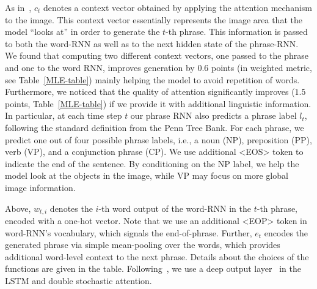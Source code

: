 As in~\cite{Xu15}, $c_t$ denotes a context vector obtained by applying the attention mechanism to the image. This context vector essentially represents the image area that the model ``looks at'' in order to generate the $t$-th phrase. This information is passed to both the word-RNN as well as to the next hidden state of the phrase-RNN. We found that computing two different context vectors, one passed to the phrase and one to the word RNN, improves generation by $0.6$ points (in weighted metric, see Table~\ref{MLE-table}) mainly helping the model to avoid repetition of words. 
Furthermore, we noticed that the quality of attention significantly improves ($1.5$ points, Table~\ref{MLE-table}) if we provide it with additional linguistic information. In particular,  at each time step $t$ our phrase RNN also predicts a phrase label $l_{t}$, following the standard definition from the Penn Tree Bank. For each phrase, we predict one out of four possible phrase labels, i.e., a noun (NP), preposition (PP), verb (VP), and a conjunction phrase (CP). We use additional <EOS> token to indicate the end of the sentence. By conditioning on the NP label, we help the model look at the objects in the image, while VP may focus on more global image information.

Above, $w_{t,i}$ denotes the $i$-th word output of the word-RNN in the $t$-th phrase, encoded with a one-hot vector. Note that we use an additional <EOP> token in word-RNN's vocabulary, which signals the end-of-phrase. Further, $e_t$ encodes the generated phrase via simple mean-pooling over the words, which provides additional word-level context to the next phrase. Details about the choices of the functions are given in the table. Following~\cite{Xu15}, we use a deep output layer~\cite{deepRnn} in the LSTM and double stochastic attention.


